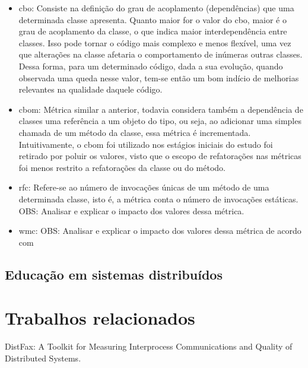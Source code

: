 \begin{itemize}
    \item \gls{cbo}: Consiste na definição do grau de acoplamento (dependências) que uma determinada classe apresenta. Quanto maior for o valor do \gls{cbo}, maior é o grau de acoplamento da classe, o que indica maior interdependência entre classes. Isso pode tornar o código mais complexo e menos flexível, uma vez que alterações na classe afetaria o comportamento de inúmeras outras classes. Dessa forma, para um determinado código, dada a sua evolução, quando observada uma queda nesse valor, tem-se então um bom indício de melhorias relevantes na qualidade daquele código.
    \item \gls{cbom}: Métrica similar a anterior, todavia considera também a dependência de classes uma referência a um objeto do tipo, ou seja, ao adicionar uma simples chamada de um método da classe, essa métrica é incrementada. Intuitivamente, o \gls{cbom} foi utilizado nos estágios iniciais do estudo foi retirado por poluir os valores, visto que o escopo de refatorações nas métricas foi menos restrito a refatorações da classe ou do método.
    \item \gls{rfc}: Refere-se ao número de invocações únicas de um método de uma determinada classe, isto é, a métrica conta o número de invocações estáticas. 
    OBS: Analisar e explicar o impacto dos valores dessa métrica.
    \item \gls{wmc}: OBS: Analisar e explicar o impacto dos valores dessa métrica de acordo com \cite{MetricsSuite}
\end{itemize}

\subsection{Educação em sistemas distribuídos}


\section{Trabalhos relacionados}
\label{section:related-work}

DistFax: A Toolkit for Measuring Interprocess Communications and Quality of Distributed Systems.
\cite{DistFax}
